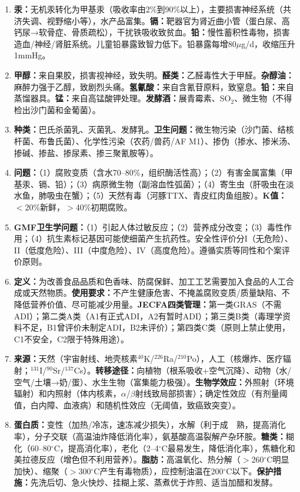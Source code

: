 {\begin{enumerate}[leftmargin=*, itemsep=6pt]
    \item \textbf{汞：}无机汞转化为甲基汞（吸收率由2\%到90\%以上），主要损害神经系统（共济失调、视野缩小等），水产品富集。\textbf{镉：}靶器官为肾近曲小管（蛋白尿、高钙尿→软骨症、骨质疏松），干扰铁吸收致贫血。\textbf{铅：}慢性蓄积性毒物，损害造血/神经/肾脏系统。儿童铅暴露致智力低下。铅暴露每增80$\mu$g/d，收缩压升1mmHg。

    \item \textbf{甲醇：}来自果胶，损害视神经，致失明。\textbf{醛类：}乙醛毒性大于甲醛。\textbf{杂醇油：}麻醉力强于乙醇，致剧烈头痛。\textbf{氢氰酸：}来自含氰苷原料，致窒息。\textbf{铅：}来自蒸馏器具。\textbf{锰：}来自高锰酸钾处理。\textbf{发酵酒：}展青霉素、SO$_2$、微生物（不得检出沙门菌和金葡菌）。

    \item \textbf{种类：}巴氏杀菌乳、灭菌乳、发酵乳。\textbf{卫生问题：}微生物污染（沙门菌、结核杆菌、布鲁氏菌）、化学性污染（农药/兽药/AF M1）、掺伪（掺水、掺米汤、掺碱、掺盐、掺尿素、掺三聚氰胺等）。

    \item \textbf{问题：}（1）腐败变质（含水70--80\%，组织酶活性高）；（2）有害金属富集（甲基汞、镉、铅）；（3）病原微生物（副溶血性弧菌）；（4）寄生虫（肝吸虫在淡水鱼，肺吸虫在蟹）；（5）天然有毒（河豚TTX、青皮红肉鱼组胺）。\textbf{K值：}$<$20\%新鲜，$>$40\%初期腐败。

    \item \textbf{GMF卫生学问题：}（1）引起人体过敏反应；（2）营养成分改变；（3）毒性作用；（4）抗生素标记基因可能使细菌产生抗药性。安全性评价分I（无危险）、II（低度危险）、III（中度危险）、IV（高度危险）。遵循实质等同性和个案评价原则。

    \item \textbf{定义：}为改善食品品质和色香味、防腐保鲜、加工工艺需要加入食品的人工合成或天然物质。\textbf{使用要求：}不产生健康危害、不掩盖腐败变质/质量缺陷、不降低营养价值、尽可能减少用量。\textbf{JECFA四类管理：}第一类GRAS（不需ADI）；第二类A类（A1有正式ADI，A2有暂时ADI）；第三类B类（毒理学资料不足，B1曾评价未制定ADI，B2未评价）；第四类C类（原则上禁止使用，C1不安全，C2限于特殊用途）。

    \item \textbf{来源：}天然（宇宙射线、地壳核素$^{40}$K/$^{226}$Ra/$^{210}$Po），人工（核爆炸、医疗辐射；$^{131}$I/$^{90}$Sr/$^{137}$Cs）。\textbf{转移途径：}向植物（根系吸收+空气沉降）、动物（水/空气/土壤→奶/蛋）、水生生物（富集能力极强）。\textbf{生物学效应：}外照射（环境辐射）和内照射（体内核素，$\alpha$/$\beta$射线致局部损害）；确定性效应（有剂量阈值，白内障、血液病）和随机性效应（无阈值，致癌致突变）。

    \item \textbf{蛋白质：}变性（加热/冷冻，速冻减少损失），水解（利于成　熟，提高消化率），分子交联（高温油炸降低消化率），氨基酸高温裂解产杂环胺。\textbf{糖类：}糊化（60--80$^\circ$C，提高消化率），老化（2--4$^\circ$C最易发生，降低消化率），焦糖化和美拉德反应（增色但不利用营养）。\textbf{脂肪：}高温氧化、热分解（$>$260$^\circ$C明显加快）、缩聚（$>$300$^\circ$C产生有毒物质），应控制油温在200$^\circ$C以下。\textbf{保护措施：}先洗后切、急火快炒、挂糊上浆、蒸煮优于炸煎、适当加醋和发酵。
\end{enumerate}

\newpage
}

